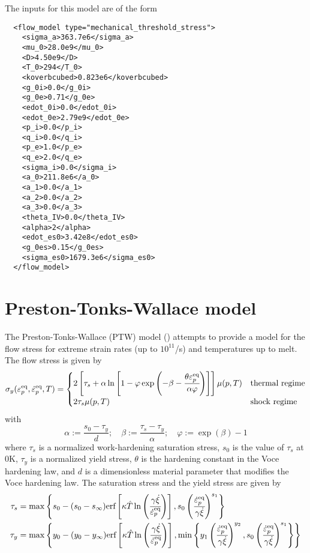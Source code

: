 The inputs for this model are of the form
\lstset{language=XML}
\begin{lstlisting}
  <flow_model type="mechanical_threshold_stress">
    <sigma_a>363.7e6</sigma_a>
    <mu_0>28.0e9</mu_0>
    <D>4.50e9</D>
    <T_0>294</T_0>
    <koverbcubed>0.823e6</koverbcubed>
    <g_0i>0.0</g_0i>
    <g_0e>0.71</g_0e>
    <edot_0i>0.0</edot_0i>
    <edot_0e>2.79e9</edot_0e>
    <p_i>0.0</p_i>
    <q_i>0.0</q_i>
    <p_e>1.0</p_e>
    <q_e>2.0</q_e>
    <sigma_i>0.0</sigma_i>
    <a_0>211.8e6</a_0>
    <a_1>0.0</a_1>
    <a_2>0.0</a_2>
    <a_3>0.0</a_3>
    <theta_IV>0.0</theta_IV>
    <alpha>2</alpha>
    <edot_es0>3.42e8</edot_es0>
    <g_0es>0.15</g_0es>
    <sigma_es0>1679.3e6</sigma_es0>
  </flow_model>
\end{lstlisting}

\section{Preston-Tonks-Wallace model}
The Preston-Tonks-Wallace (PTW) model (\cite{Preston2003}) attempts to 
provide a model for the flow stress for extreme strain rates 
(up to $10^{11}$/s) and temperatures up to melt.  The flow stress is
given by
\begin{equation}
  \sigma_y(\varepsilon_p^\text{eq},\dot{\varepsilon}_{p}^\text{eq},T) = 
     \begin{cases}
       2\left[\tau_s + \alpha\ln\left[1 - \varphi
        \exp\left(-\beta-\cfrac{\theta\varepsilon_p^\text{eq}}{\alpha\varphi}\right)\right]\right]
       \mu(p,T) & \text{thermal regime} \\
       2\tau_s\mu(p,T) & \text{shock regime}
     \end{cases}
\end{equation}
with 
\begin{equation}
  \alpha := \frac{s_0 - \tau_y}{d}; \quad
  \beta := \frac{\tau_s - \tau_y}{\alpha}; \quad
  \varphi := \exp(\beta) - 1
\end{equation}
where $\tau_s$ is a normalized work-hardening saturation stress,
$s_0$ is the value of $\tau_s$ at 0K,
$\tau_y$ is a normalized yield stress, $\theta$ is the hardening constant
in the Voce hardening law, and $d$ is a dimensionless material
parameter that modifies the Voce hardening law.  The saturation stress
and the yield stress are given by
\begin{align}
  \tau_s & = \max\left\{s_0 - (s_0 - s_{\infty})
     \text{erf}\left[\kappa
       \hat{T}\ln\left(\cfrac{\gamma\dot{\xi}}{\dot{\varepsilon}_{p}^\text{eq}}\right)\right],
     s_0\left(\cfrac{\dot{\varepsilon}_{p}^\text{eq}}{\gamma\dot{\xi}}\right)^{s_1}\right\} \\
  \tau_y & = \max\left\{y_0 - (y_0 - y_{\infty})
     \text{erf}\left[\kappa
       \hat{T}\ln\left(\cfrac{\gamma\dot{\xi}}{\dot{\varepsilon}_{p}^\text{eq}}\right)\right],
     \min\left\{
       y_1\left(\cfrac{\dot{\varepsilon}_{p}^\text{eq}}{\gamma\dot{\xi}}\right)^{y_2}, 
       s_0\left(\cfrac{\dot{\varepsilon}_{p}^\text{eq}}{\gamma\dot{\xi}}\right)^{s_1}\right\}\right\} 
\end{align}
